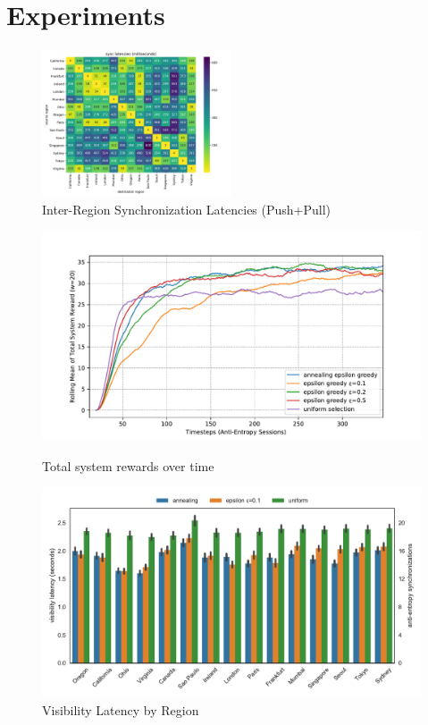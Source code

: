\section*{Experiments}

\begin{figure}[b]
    \centering
    \includegraphics[width=0.5\textwidth]{figures/latency_sync_heatmap}
    \caption{Inter-Region Synchronization Latencies (Push+Pull)}
    \label{fig:latency_sync_heatmap}
\end{figure}

\begin{figure}[t]
    \centering
      \includegraphics[width=\linewidth]{figures/rewards}
      \caption{Total system rewards over time}
      \label{fig:system_rewards}
    \endminipage\hfill
      \includegraphics[width=\linewidth]{figures/visibility_latency}
      \caption{Visibility Latency by Region}
      \label{fig:visibility_latency}
    \endminipage
\end{figure}

